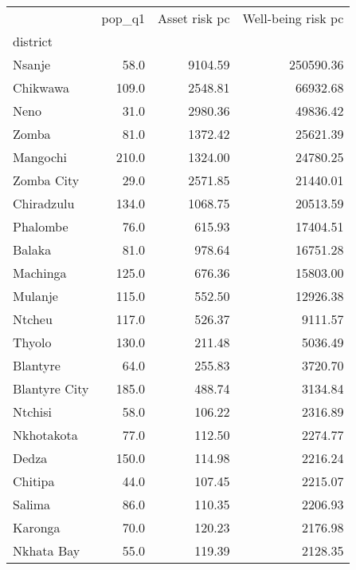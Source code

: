 \begin{tabular}{lrrr}
\toprule
{} &  pop\_q1 &  Asset risk pc &  Well-being risk pc \\
district      &         &                &                     \\
\midrule
Nsanje        &    58.0 &        9104.59 &           250590.36 \\
Chikwawa      &   109.0 &        2548.81 &            66932.68 \\
Neno          &    31.0 &        2980.36 &            49836.42 \\
Zomba         &    81.0 &        1372.42 &            25621.39 \\
Mangochi      &   210.0 &        1324.00 &            24780.25 \\
Zomba City    &    29.0 &        2571.85 &            21440.01 \\
Chiradzulu    &   134.0 &        1068.75 &            20513.59 \\
Phalombe      &    76.0 &         615.93 &            17404.51 \\
Balaka        &    81.0 &         978.64 &            16751.28 \\
Machinga      &   125.0 &         676.36 &            15803.00 \\
Mulanje       &   115.0 &         552.50 &            12926.38 \\
Ntcheu        &   117.0 &         526.37 &             9111.57 \\
Thyolo        &   130.0 &         211.48 &             5036.49 \\
Blantyre      &    64.0 &         255.83 &             3720.70 \\
Blantyre City &   185.0 &         488.74 &             3134.84 \\
Ntchisi       &    58.0 &         106.22 &             2316.89 \\
Nkhotakota    &    77.0 &         112.50 &             2274.77 \\
Dedza         &   150.0 &         114.98 &             2216.24 \\
Chitipa       &    44.0 &         107.45 &             2215.07 \\
Salima        &    86.0 &         110.35 &             2206.93 \\
Karonga       &    70.0 &         120.23 &             2176.98 \\
Nkhata Bay    &    55.0 &         119.39 &             2128.35 \\

\end{tabular}
